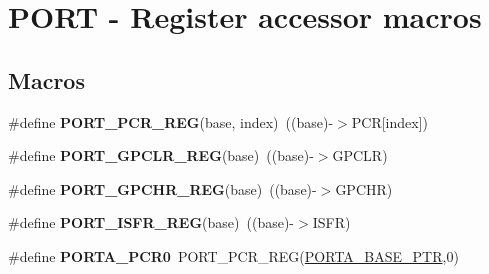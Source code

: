 \hypertarget{group___p_o_r_t___register___accessor___macros}{}\section{P\+O\+RT -\/ Register accessor macros}
\label{group___p_o_r_t___register___accessor___macros}
\subsection*{Macros}
\begin{DoxyCompactItemize}
\item 
\mbox{\label{group___p_o_r_t___register___accessor___macros_ga7a4a549c0ffd6b98b9fbfc0bdcfb5cea}} 
\#define {\bfseries P\+O\+R\+T\+\_\+\+P\+C\+R\+\_\+\+R\+EG}(base,  index)~((base)-\/$>$P\+CR\mbox{[}index\mbox{]})
\item 
\mbox{\label{group___p_o_r_t___register___accessor___macros_ga87d8b85c821b383c37cfedaa30eeb27c}} 
\#define {\bfseries P\+O\+R\+T\+\_\+\+G\+P\+C\+L\+R\+\_\+\+R\+EG}(base)~((base)-\/$>$G\+P\+C\+LR)
\item 
\mbox{\label{group___p_o_r_t___register___accessor___macros_ga5b60d88d1233de175d8e51c5b65b3ff0}} 
\#define {\bfseries P\+O\+R\+T\+\_\+\+G\+P\+C\+H\+R\+\_\+\+R\+EG}(base)~((base)-\/$>$G\+P\+C\+HR)
\item 
\mbox{\label{group___p_o_r_t___register___accessor___macros_ga71010d47c68b6ac12dbc646ad2cd5a2f}} 
\#define {\bfseries P\+O\+R\+T\+\_\+\+I\+S\+F\+R\+\_\+\+R\+EG}(base)~((base)-\/$>$I\+S\+FR)
\item 
\mbox{\label{group___p_o_r_t___register___accessor___macros_gaf09680dfe5ed3f1f4df46364406b5d65}} 
\#define {\bfseries P\+O\+R\+T\+A\+\_\+\+P\+C\+R0}~P\+O\+R\+T\+\_\+\+P\+C\+R\+\_\+\+R\+EG(\hyperlink{group___p_o_r_t___peripheral_gaa18ec7594fe603225220ec6eda4a19ce}{P\+O\+R\+T\+A\+\_\+\+B\+A\+S\+E\+\_\+\+P\+TR},0)
\item 
\mbox{\label{group___p_o_r_t___register___accessor___macros_gaa0028ded7cfc5ec26b8736ce6b6cab1d}} 

\end{DoxyCompactItemize}
